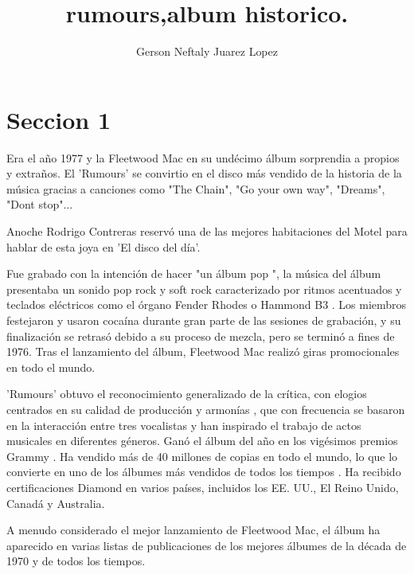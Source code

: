 \documentclass[a4paper,10pt]{article}
\title{rumours,album historico.} %
\author{Gerson Neftaly Juarez Lopez } %
\begin{document}
\maketitle

% 

\section{Seccion 1}

Era el año 1977 y la Fleetwood Mac en su undécimo álbum sorprendia a propios y extraños. El 'Rumours' se convirtio en el disco más vendido de la historia de la música gracias a canciones como "The Chain", "Go your own way", "Dreams", "Dont stop"...

Anoche Rodrigo Contreras reservó una de las mejores habitaciones del Motel para hablar de esta joya en 'El disco del día'.

Fue grabado con la intención de hacer "un álbum pop ", la música del álbum presentaba un sonido pop rock y soft rock caracterizado por ritmos acentuados y teclados eléctricos como el órgano Fender Rhodes o Hammond B3 . Los miembros festejaron y usaron cocaína durante gran parte de las sesiones de grabación, y su finalización se retrasó debido a su proceso de mezcla, pero se terminó a fines de 1976. Tras el lanzamiento del álbum, Fleetwood Mac realizó giras promocionales en todo el mundo. 

'Rumours' obtuvo el reconocimiento generalizado de la crítica, con elogios centrados en su calidad de producción y armonías , que con frecuencia se basaron en la interacción entre tres vocalistas y han inspirado el trabajo de actos musicales en diferentes géneros. Ganó el álbum del año en los vigésimos premios Grammy . Ha vendido más de 40 millones de copias en todo el mundo, lo que lo convierte en uno de los álbumes más vendidos de todos los tiempos . Ha recibido certificaciones Diamond en varios países, incluidos los EE. UU., El Reino Unido, Canadá y Australia.

A menudo considerado el mejor lanzamiento de Fleetwood Mac, el álbum ha aparecido en varias listas de publicaciones de los mejores álbumes de la década de 1970 y de todos los tiempos. \\ %
\end{document}

